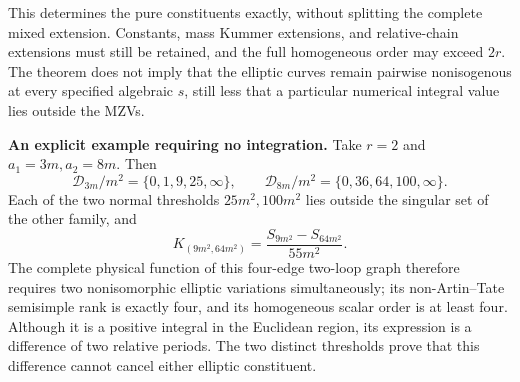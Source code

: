 \documentclass[11pt,a4paper,oneside]{article}
\theoremstyle{plain}
\theoremstyle{definition}
\theoremstyle{remark}
\numberwithin{equation}{section}
\begin{document}
This determines the pure constituents exactly, without splitting the complete mixed extension.
Constants, mass Kummer extensions, and relative-chain extensions must still be retained, and the full homogeneous order may exceed $2r$.
The theorem does not imply that the elliptic curves remain pairwise nonisogenous at every specified algebraic $s$,
still less that a particular numerical integral value lies outside the MZVs.

\textbf{An explicit example requiring no integration.}
Take $r=2$ and $a_1=3m,a_2=8m$. Then
\[
 \mathcal D_{3m}/m^2=\{0,1,9,25,\infty\},\qquad
 \mathcal D_{8m}/m^2=\{0,36,64,100,\infty\}.
\]
Each of the two normal thresholds $25m^2,100m^2$ lies outside the singular set of the other family, and
\[
 K_{(9m^2,64m^2)}
   =\frac{S_{9m^2}-S_{64m^2}}{55m^2}.
\]
The complete physical function of this four-edge two-loop graph therefore requires two nonisomorphic elliptic variations simultaneously;
its non-Artin--Tate semisimple rank is exactly four, and its homogeneous scalar order is at least four.
Although it is a positive integral in the Euclidean region, its expression is a difference of two relative periods.
The two distinct thresholds prove that this difference cannot cancel either elliptic constituent.
\end{document}
